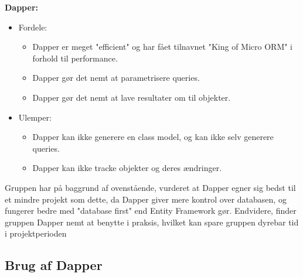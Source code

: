 \textbf{Dapper:}
\begin{itemize}
    \item Fordele:
    \begin{itemize}
        \item Dapper er meget "efficient" og har fået tilnavnet "King of Micro ORM" i forhold til performance.
        \item Dapper gør det nemt at parametrisere queries.
        \item Dapper gør det nemt at lave resultater om til objekter.
    \end{itemize}
    \item Ulemper:
    \begin{itemize}
        \item Dapper kan ikke generere en class model, og kan ikke selv generere queries.
        \item Dapper kan ikke tracke objekter og deres ændringer.
    \end{itemize}
\end{itemize}

Gruppen har på baggrund af ovenstående, vurderet at Dapper egner sig bedst til et mindre projekt som
dette, da Dapper giver mere kontrol over databasen, og fungerer bedre med "database first" end
Entity Framework gør. Endvidere, finder gruppen Dapper nemt at benytte i praksis, hvilket kan spare gruppen dyrebar
tid i projektperioden

\subsection{Brug af Dapper}
